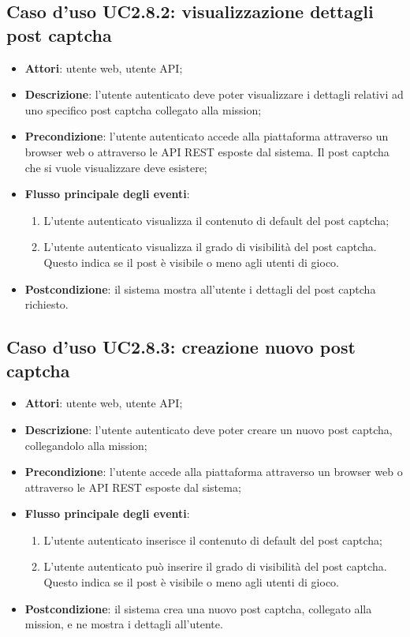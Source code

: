 \subsection{Caso d'uso UC2.8.2: visualizzazione dettagli post captcha}
\begin{itemize}
\item \textbf{Attori}: utente web, utente API;
\item \textbf{Descrizione}: l'utente autenticato deve poter visualizzare i dettagli relativi ad uno specifico post captcha collegato alla mission; 
      \item \textbf{Precondizione}: l'utente autenticato accede alla piattaforma attraverso un browser web o attraverso le API REST esposte dal sistema. Il post captcha che si vuole visualizzare deve esistere;

        \item \textbf{Flusso principale degli eventi}:
          \begin{enumerate}
          \item L'utente autenticato visualizza il contenuto di default del post captcha;
          \item L'utente autenticato visualizza il grado di visibilità del post captcha. Questo indica se il post è visibile o meno agli utenti di gioco.

      \end{enumerate}
    \item \textbf{Postcondizione}: il sistema mostra all'utente i dettagli del post captcha richiesto.
  \end{itemize}
\hypertarget{UC2.8.3}{}
\subsection{Caso d'uso UC2.8.3: creazione nuovo post captcha}
\begin{itemize}
\item \textbf{Attori}: utente web, utente API;
\item \textbf{Descrizione}: l'utente autenticato deve poter creare un nuovo post captcha, collegandolo alla mission; 
      \item \textbf{Precondizione}: l'utente accede alla piattaforma attraverso un browser web o attraverso le API REST esposte dal sistema;

        \item \textbf{Flusso principale degli eventi}:
          \begin{enumerate}
          \item L'utente autenticato inserisce il contenuto di default del post captcha;
          \item L'utente autenticato può inserire il grado di visibilità del post captcha. Questo indica se il post è visibile o meno agli utenti di gioco.

      \end{enumerate}
    \item \textbf{Postcondizione}: il sistema crea una nuovo post captcha, collegato alla mission, e ne mostra i dettagli all'utente.
  \end{itemize}
\hypertarget{UC2.8.4}{}
